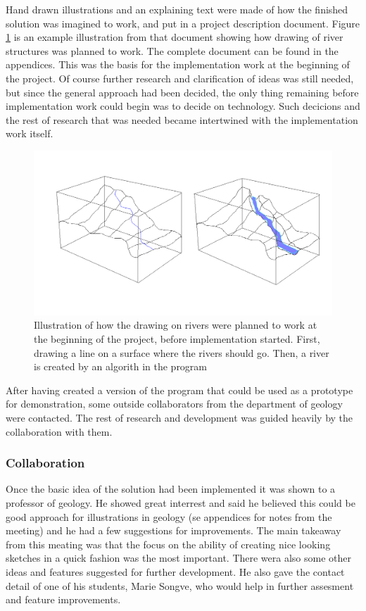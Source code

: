 \documentclass[a4paper,12pt]{article}
\begin{document}
Hand drawn illustrations and an explaining text were made of how the finished solution was imagined to work, and put in a project description document. Figure \ref{fig:riverDesription} is an example illustration from that document showing how drawing of river structures was planned to work. The complete document can be found in the appendices. This was the basis for the implementation work at the beginning of the project. Of course further research and clarification of ideas was still needed, but since the general approach had been decided, the only thing remaining before implementation work could begin was to decide on technology. Such decicions  and the rest of research that was needed became intertwined with the implementation work itself. 

\begin{figure}
 \includegraphics[width=\linewidth]{thesis/river.png}
 \caption{Illustration of how the drawing on rivers were planned to work at the beginning of the project, before implementation started. First, drawing a line on a surface where the rivers should go. Then, a river is created by an algorith in the program}
 \label{fig:riverDesription}
\end{figure}

After having created a version of the program that could be used as a prototype for demonstration, some outside collaborators from the department of geology were contacted. The rest of research and development was guided heavily by the collaboration with them.

\subsubsection{Collaboration}
Once the basic idea of the solution had been implemented it was shown to a professor of geology. He showed great interrest and said he believed this could be good approach for illustrations in geology (se appendices for notes from the meeting) and he had a few suggestions for improvements. The main takeaway from this meating was that the focus on the ability of creating nice looking sketches in a quick fashion was the most important. There wera also some other ideas and features suggested for further development. He also gave the contact detail of one of his students, Marie Songve, who would help in further assesment and feature improvements.
\end{document}
